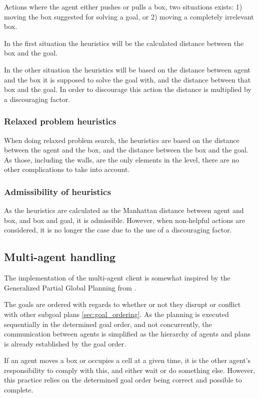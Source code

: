 \documentclass[Main]{subfiles}
\begin{document}
Actions where the agent either pushes or pulls a box, two situations exists: 
1) moving the box suggested for solving a goal, or 
2) moving a completely irrelevant box.
 
In the first situation the heuristics will be the calculated distance between the box and the goal.

In the other situation the heuristics will be based on the distance between
agent and the box it is supposed to solve the goal with, and the distance
between that box and the goal.
In order to discourage this action the distance is multiplied by a discouraging factor.

\subsubsection{Relaxed problem heuristics}
When doing relaxed problem search, the heuristics are based on the distance
between the agent and the box, and the distance between the box and the goal.
As those, including the walls, are the only elements in the level,
there are no other complications to take into account. 

\subsubsection{Admissibility of heuristics}
As the heuristics are calculated as the Manhattan distance between agent and
box, and box and goal, it is admissible. However, when non-helpful actions are
considered, it is no longer the case due to the use of a discouraging factor. 

\subsection{Multi-agent handling} 
The implementation of the multi-agent client is somewhat inspired by the
Generalized Partial Global Planning from \cite{Decker2000}. 

The goals are ordered with regards to whether or not they disrupt or conflict
with other subgoal plans \autoref{sec:goal_ordering}. As the planning is
executed sequentially in the determined goal order, and not concurrently, the
communication between agents is simplified as the hierarchy of agents and plans
is already established by the goal order. 

If an agent moves a box or occupies a cell at a given time, it is the other
agent's responsibility to comply with this, and either wait or do something else.
However, this practice relies on the determined goal order being correct and
possible to complete. 
\end{document}
